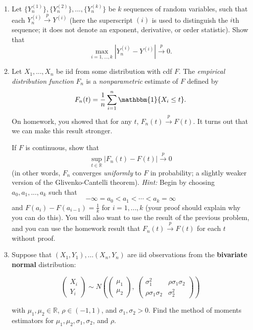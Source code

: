 \documentclass[11pt]{article}
\begin{document}
\begin{enumerate}

\item Let $\{Y_n^{(1)}\}, \{Y_n^{(2)}\}, ..., \{Y_n^{(k)}\}$ be $k$ sequences of random variables, such that each $Y_n^{(i)} \overset{p}{\to} Y^{(i)}$ (here the superscript $(i)$ is used to distinguish the $i$th sequence; it does not denote an exponent, derivative, or order statistic). Show that
$$\max \limits_{i=1,...,k} |Y_n^{(i)} - Y^{(i)}| \overset{p}{\to} 0.$$

\bigskip

\item Let $X_1,...,X_n$ be iid from some distribution with cdf $F$. The \textit{empirical distribution function} $F_n$ is a \textit{nonparametric} estimate of $F$ defined by
$$F_n(t) = \frac{1}{n} \sum \limits_{i=1}^n \mathbbm{1}\{X_i \leq t \}.$$
On homework, you showed that for any $t$, $F_n(t) \overset{p}{\to} F(t)$. It turns out that we can make this result stronger. 

If $F$ is continuous, show that
$$\sup \limits_{t \in \mathbb{R}} |F_n(t) - F(t)| \overset{p}{\to} 0$$
(in other words, $F_n$ converges \textit{uniformly} to $F$ in probability; a slightly weaker version of the Glivenko-Cantelli theorem). \textit{Hint:} Begin by choosing $a_0, a_1,...,a_k$ such that 
$$-\infty = a_0 < a_1 < \cdots < a_k = \infty$$
and $F(a_i) - F(a_{i-1}) = \frac{1}{k}$ for $i = 1,...,k$ (your proof should explain why you can do this). You will also want to use the result of the previous problem, and you can use the homework result that $F_n(t) \overset{p}{\to} F(t)$ for each $t$ without proof.


\item Suppose that $(X_1, Y_1),...(X_n, Y_n)$ are iid observations from the \textbf{bivariate normal} distribution:

$$\begin{pmatrix}
X_i \\ Y_i
\end{pmatrix} \sim N\left( \begin{pmatrix}
\mu_1 \\ \mu_2
\end{pmatrix}, \ \begin{pmatrix}
\sigma_1^2 & \rho \sigma_1 \sigma_2 \\ 
\rho \sigma_1 \sigma_2 & \sigma_2^2
\end{pmatrix} \right)
$$

with $\mu_1, \mu_2 \in \mathbb{R}$, $\rho \in (-1, 1)$, and $\sigma_1, \sigma_2 > 0$. Find the method of moments estimators for $\mu_1, \mu_2, \sigma_1, \sigma_2$, and $\rho$.


\end{enumerate}
\end{document}
